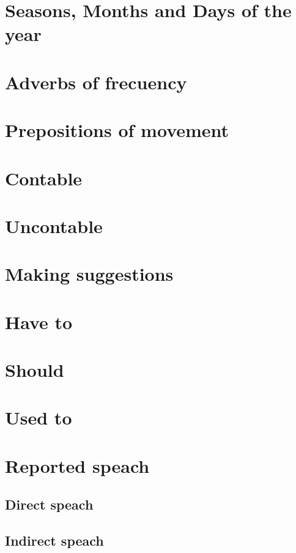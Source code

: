 \documentclass[12pt,openany]{book}
\begin{document}
	\section{Seasons, Months and Days of the year}

	\section{Adverbs of frecuency}

	\section{Prepositions of movement}

	\section{Contable}

	\section{Uncontable}

	

	\section{Making suggestions}

	\section{Have to}

	\section{Should}

	\section{Used to}
	
	\section{Reported speach}

		\subsection{Direct speach}

		\subsection{Indirect speach}
\end{document}
